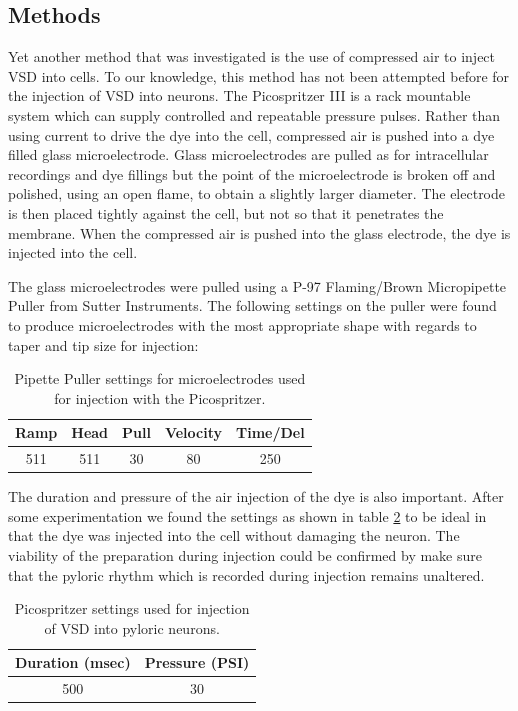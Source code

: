 \subsection{Methods}
\label{subsec:picospritzer}
Yet another method that was investigated is the use of compressed air to inject \ac{VSD} into cells. To our knowledge, this method has not been attempted before for the injection of \ac{VSD} into neurons. The Picospritzer III is a rack mountable system which can supply controlled and repeatable pressure pulses. Rather than using current to drive the dye into the cell, compressed air is pushed into a dye filled glass microelectrode. Glass microelectrodes are pulled as for intracellular recordings and dye fillings but the point of the microelectrode is broken off and polished, using an open flame, to obtain a slightly larger diameter. The electrode is then placed tightly against the cell, but not so that it penetrates the membrane. When the compressed air is pushed into the glass electrode, the dye is injected into the cell.

The glass microelectrodes were pulled using a P-97 Flaming/Brown Micropipette Puller from Sutter Instruments. The following settings on the puller were found to produce microelectrodes with the most appropriate shape with regards to taper and tip size for injection:

\begin{table}[H]
	\centering
	\label{tab:puller}
	\caption{Pipette Puller settings for microelectrodes used for injection with the Picospritzer.}
	\begin{tabular}{c c c c c}
		Ramp & Head & Pull & Velocity & Time/Del \\ \hline
		511 & 511 & 30 & 80 & 250
	\end{tabular}
\end{table}

The duration and pressure of the air injection of the dye is also important. After some experimentation we found the settings as shown in table \ref{tab:injection} to be ideal in that the dye was injected into the cell without damaging the neuron. The viability of the preparation during injection could be confirmed by make sure that the pyloric rhythm which is recorded during injection remains unaltered.

\begin{table}[H]
	\centering
	\caption{Picospritzer settings used for injection of \ac{VSD} into pyloric neurons.}
	\label{tab:injection}
	\begin{tabular}{c c}
		Duration (msec) & Pressure (PSI) \\ \hline
		500 & 30 
	\end{tabular}
\end{table}

